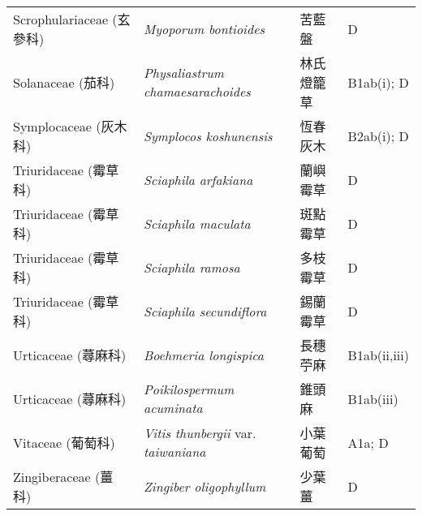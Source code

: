 \begin{longtable}{p{3cm}p{5cm}p{3cm}p{4cm}}
    Scrophulariaceae (玄參科) & \textit{Myoporum bontioides}  & 苦藍盤 & D \index{Myoporum@\textit{Myoporum}!bontioides@\textit{bontioides}}  \index{苦藍盤} \\
    Solanaceae (茄科) & \textit{Physaliastrum chamaesarachoides}  & 林氏燈籠草 & B1ab(i); D \index{Physaliastrum@\textit{Physaliastrum}!chamaesarachoides@\textit{chamaesarachoides}}  \index{林氏燈籠草} \\
    Symplocaceae (灰木科) & \textit{Symplocos koshunensis}  & 恆春灰木 & B2ab(i); D \index{Symplocos@\textit{Symplocos}!koshunensis@\textit{koshunensis}}  \index{恆春灰木} \\
    Triuridaceae (霉草科) & \textit{Sciaphila arfakiana}  & 蘭嶼霉草 & D \index{Sciaphila@\textit{Sciaphila}!arfakiana@\textit{arfakiana}}  \index{蘭嶼霉草} \\
    Triuridaceae (霉草科) & \textit{Sciaphila maculata}  & 斑點霉草 & D \index{Sciaphila@\textit{Sciaphila}!maculata@\textit{maculata}}  \index{斑點霉草} \\
    Triuridaceae (霉草科) & \textit{Sciaphila ramosa}  & 多枝霉草 & D \index{Sciaphila@\textit{Sciaphila}!ramosa@\textit{ramosa}}  \index{多枝霉草} \\
    Triuridaceae (霉草科) & \textit{Sciaphila secundiflora}  & 錫蘭霉草 & D \index{Sciaphila@\textit{Sciaphila}!secundiflora@\textit{secundiflora}}  \index{錫蘭霉草} \\
    Urticaceae (蕁麻科) & \textit{Boehmeria longispica}  & 長穗苧麻 & B1ab(ii,iii) \index{Boehmeria@\textit{Boehmeria}!longispica@\textit{longispica}}  \index{長穗苧麻} \\
    Urticaceae (蕁麻科) & \textit{Poikilospermum acuminata}  & 錐頭麻 & B1ab(iii) \index{Poikilospermum@\textit{Poikilospermum}!acuminata@\textit{acuminata}}  \index{錐頭麻} \\
    Vitaceae (葡萄科) & \textit{Vitis thunbergii} var. \textit{taiwaniana}  & 小葉葡萄 & A1a; D \index{Vitis@\textit{Vitis}!thunbergii@\textit{thunbergii}!var. taiwaniana@var. \textit{taiwaniana}}  \index{小葉葡萄} \\
    Zingiberaceae (薑科) & \textit{Zingiber oligophyllum}  & 少葉薑 & D \index{Zingiber@\textit{Zingiber}!oligophyllum@\textit{oligophyllum}}  \index{少葉薑} \\
    \bottomrule
        \end{longtable}
